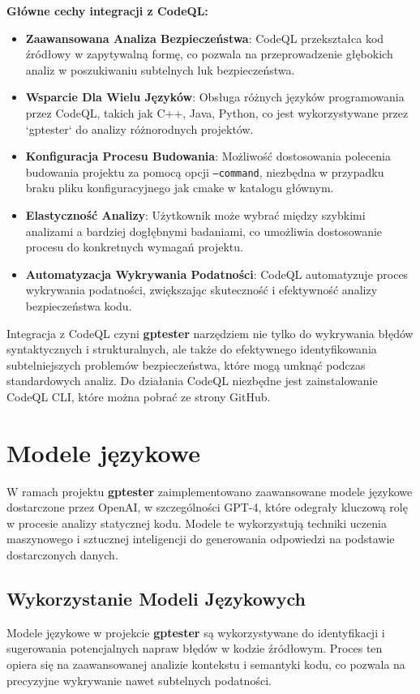 \textbf{Główne cechy integracji z CodeQL:}
\begin{itemize}
    \item \textbf{Zaawansowana Analiza Bezpieczeństwa}: CodeQL przekształca kod źródłowy w zapytywalną formę, co pozwala na przeprowadzenie głębokich analiz w poszukiwaniu subtelnych luk bezpieczeństwa.
    \item \textbf{Wsparcie Dla Wielu Języków}: Obsługa różnych języków programowania przez CodeQL, takich jak C++, Java, Python, co jest wykorzystywane przez `gptester` do analizy różnorodnych projektów.
    \item \textbf{Konfiguracja Procesu Budowania}: Możliwość dostosowania polecenia budowania projektu za pomocą opcji \texttt{--command}, niezbędna w przypadku braku pliku konfiguracyjnego jak cmake w katalogu głównym.
    \item \textbf{Elastyczność Analizy}: Użytkownik może wybrać między szybkimi analizami a bardziej dogłębnymi badaniami, co umożliwia dostosowanie procesu do konkretnych wymagań projektu.
    \item \textbf{Automatyzacja Wykrywania Podatności}: CodeQL automatyzuje proces wykrywania podatności, zwiększając skuteczność i efektywność analizy bezpieczeństwa kodu.
\end{itemize}

Integracja z CodeQL czyni \textbf{gptester} narzędziem nie tylko do wykrywania błędów syntaktycznych i strukturalnych, ale także do efektywnego identyfikowania subtelniejszych problemów bezpieczeństwa, które mogą umknąć podczas standardowych analiz.
Do działania CodeQL niezbędne jest zainstalowanie CodeQL CLI, które można pobrać ze strony GitHub.

\section{Modele językowe}
\label{sec:modele_jezykowe}

W ramach projektu \textbf{gptester} zaimplementowano zaawansowane modele językowe dostarczone przez OpenAI, w szczególności GPT-4, które odegrały kluczową rolę w procesie analizy statycznej kodu. Modele te wykorzystują techniki uczenia maszynowego i sztucznej inteligencji do generowania odpowiedzi na podstawie dostarczonych danych.

\subsection{Wykorzystanie Modeli Językowych}
Modele językowe w projekcie \textbf{gptester} są wykorzystywane do identyfikacji i sugerowania potencjalnych napraw błędów w kodzie źródłowym. Proces ten opiera się na zaawansowanej analizie kontekstu i semantyki kodu, co pozwala na precyzyjne wykrywanie nawet subtelnych podatności.

